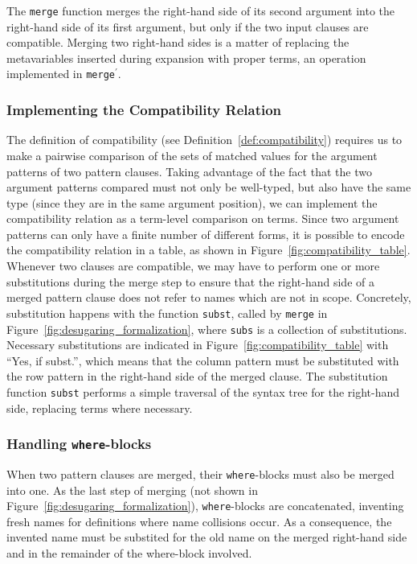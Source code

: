 The \texttt{merge} function merges the right-hand side of its second argument
into the right-hand side of its first argument, but only if the two input
clauses are compatible. Merging two right-hand sides is a matter of replacing
the metavariables inserted during expansion with proper terms, an operation
implemented in \texttt{merge$^\prime$}.

\subsubsection{Implementing the Compatibility Relation}
The definition of compatibility (see Definition~\ref{def:compatibility})
requires us to make a pairwise comparison of the sets of matched values for the
argument patterns of two pattern clauses. Taking advantage of the fact that the two
argument patterns compared must not only be well-typed, but also have the same
type (since they are in the same argument position), we can implement the compatibility
relation as a term-level comparison on \IdrisM{} terms. Since two argument patterns
can only have a finite number of different forms, it is possible to encode the
compatibility relation in a table, as shown in
Figure~\ref{fig:compatibility_table}. Whenever two clauses are compatible, we may have to perform one or more
substitutions during the merge step to ensure that the right-hand side of a
merged pattern clause does not refer to names which are not in
scope. Concretely, substitution happens with the function \texttt{subst}, called
by \texttt{merge} in Figure~\ref{fig:desugaring_formalization}, where
\texttt{subs} is a collection of substitutions. Necessary substitutions are indicated in
Figure~\ref{fig:compatibility_table} with ``Yes, if subst.'', which means that
the column pattern must be substituted with the row pattern in the right-hand
side of the merged clause. The substitution function \texttt{subst} performs a simple traversal of the
syntax tree for the right-hand side, replacing terms where necessary.

\subsubsection{Handling \texttt{where}-blocks}
When two pattern clauses are merged, their \texttt{where}-blocks must also be
merged into one. As the last step of merging (not shown in
Figure~\ref{fig:desugaring_formalization}), \texttt{where}-blocks are
concatenated, inventing fresh names for definitions where name collisions
occur. As a consequence, the invented name must be substited for the old name on the
merged right-hand side and in the remainder of the where-block involved. 

